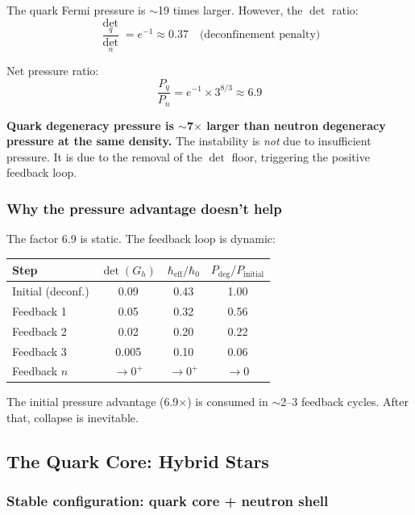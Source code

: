 The quark Fermi pressure is $\sim$19 times larger. However, the $\det$ ratio:
\begin{equation}
\frac{\det_q}{\det_n} = e^{-1} \approx 0.37 \quad \text{(deconfinement penalty)}
\end{equation}

Net pressure ratio:
\begin{equation}
\frac{P_q}{P_n} = e^{-1} \times 3^{8/3} \approx 6.9
\end{equation}

\textbf{Quark degeneracy pressure is $\sim$7$\times$ larger than neutron degeneracy pressure at the same density.} The instability is \emph{not} due to insufficient pressure. It is due to the removal of the $\det$ floor, triggering the positive feedback loop.

\subsubsection{Why the pressure advantage doesn't help}

The factor 6.9 is static. The feedback loop is dynamic:

\begin{center}
\begin{tabular}{lccc}
\hline
Step & $\det(G_h)$ & $\hbar_\text{eff}/\hbar_0$ & $P_\text{deg}/P_\text{initial}$ \\
\hline
Initial (deconf.) & 0.09 & 0.43 & 1.00 \\
Feedback 1 & 0.05 & 0.32 & 0.56 \\
Feedback 2 & 0.02 & 0.20 & 0.22 \\
Feedback 3 & 0.005 & 0.10 & 0.06 \\
Feedback $n$ & $\to 0^+$ & $\to 0^+$ & $\to 0$ \\
\hline
\end{tabular}
\end{center}

The initial pressure advantage (6.9$\times$) is consumed in $\sim$2--3 feedback cycles. After that, collapse is inevitable.

\subsection{The Quark Core: Hybrid Stars}

\subsubsection{Stable configuration: quark core + neutron shell}

